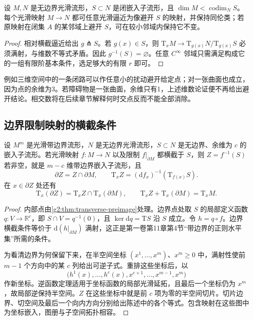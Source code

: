 \begin{corollary}\label{g2:cor:avoid-high-codimension}
	设 \(M,N\) 是无边界光滑流形，\(S\subset N\) 是闭嵌入子流形，且 \(\dim M<\operatorname{codim}_N S\)。每个光滑映射 \(M\to N\) 都可任意光滑逼近为像避开 \(S\) 的映射，并保持同伦类；若原映射在闭集 \(A\) 的某邻域上避开 \(S\)，可在较小邻域内保持它不变。
\end{corollary}
\begin{proof}
	相对横截逼近给出 \(g\pitchfork S\)。若 \(g(x)\in S\)，则 \(\mathrm{T}_xM\to\mathrm{T}_{g(x)}N/\mathrm{T}_{g(x)}S\) 必须满射，与维数不等式矛盾。因此 \(g^{-1}(S)=\varnothing\)。任意 \(C^\infty\) 邻域只需满足构成它的一组有限阶基本条件，选足够大的有限 \(r\) 即可。
\end{proof}

例如三维空间中的一条闭路可以作任意小的扰动避开给定点；对一张曲面也成立，因为点的余维为3。若障碍物是一张曲面，余维只有1，上述维数论证便不再给出避开结论。相交数将在后续章节解释何时交点反而不能全部消除。

\subsection{边界限制映射的横截条件}
\label{g2:subsec:1404:03}

\begin{theorem}\label{g2:thm:boundary-transverse-preimage}
	设 \(M^m\) 是光滑带边界流形，\(N\) 是无边界光滑流形，\(S\subset N\) 是无边界、余维为 \(c\) 的嵌入子流形。若光滑映射 \(f:M\to N\) 以及限制 \(f|_{\partial M}\) 都横截于 \(S\)，则 \(Z=f^{-1}(S)\) 若非空，就是 \(m-c\) 维带边界嵌入子流形，且
	\[
		\partial Z=Z\cap\partial M,\qquad
		\mathrm{T}_xZ=(\mathrm{d}f_x)^{-1}(\mathrm{T}_{f(x)}S).
	\]
	在 \(x\in\partial Z\) 处还有
	\[
		\mathrm{T}_x(\partial Z)=\mathrm{T}_xZ\cap\mathrm{T}_x(\partial M),\qquad
		\mathrm{T}_xZ+\mathrm{T}_x(\partial M)=\mathrm{T}_xM.
	\]
\end{theorem}
\begin{proof}
	内部点由\cref{g2:thm:transverse-preimage}处理。边界点处取 \(S\) 的局部定义函数 \(q:V\to\mathbb R^c\)，即 \(S\cap V=q^{-1}(0)\)，且 \(\ker\mathrm{d}q=\mathrm{T}S\) 沿 \(S\) 成立。令 \(h=q\circ f\)。边界横截条件等价于 \(\mathrm{d}(h|_{\partial M})\) 满射，这正是第一卷第11章第4节“带边界的正则水平集”所需的条件。

	为看清边界为何保留下来，在半空间坐标 \((x^1,\ldots,x^m)\)、\(x^m\ge0\) 中，满射性使前 \(m-1\) 个方向中的某 \(c\) 列给出可逆子式。重排这些坐标后，以
	\[
		\bigl(h^1(x),\ldots,h^c(x),x^{c+1},\ldots,x^{m-1},x^m\bigr)
	\]
	作新坐标。逆函数定理适用于坐标函数的局部光滑延拓，且最后一个坐标仍为 \(x^m\)，故局部逆保持半空间。\(Z\) 在这些坐标中就是前 \(c\) 项为零的半空间切片。切片边界、切空间及最后一个向内方向分别给出陈述中的各个等式。包含映射在这些图中为坐标嵌入，图册与子空间拓扑相容。
\end{proof}

